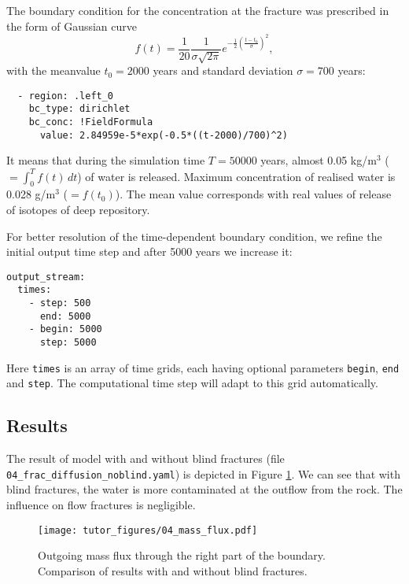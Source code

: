 The boundary condition for the concentration at the fracture was
prescribed in the form of Gaussian curve
\[ f(t) = \frac1{20} \frac{1}{\sigma\sqrt{2\pi}}e^{-\frac12\left(\frac{t-t_0}{\sigma}\right)^2}, \]
with the meanvalue \(t_0=2000\) years and standard deviation
\(\sigma=700\) years:

\begin{verbatim}
  - region: .left_0
    bc_type: dirichlet
    bc_conc: !FieldFormula
      value: 2.84959e-5*exp(-0.5*((t-2000)/700)^2)
\end{verbatim}

It means that during the simulation time \(T=50000\) years, almost 0.05
kg/m\(^3\) (\(=\int_0^Tf(t)\,dt\)) of water is released. Maximum
concentration of realised water is 0.028 g/m\(^3\) (\(=f(t_0)\)). The
mean value corresponds with real values of release of isotopes of deep
repository.

For better resolution of the time-dependent boundary condition, we
refine the initial output time step and after 5000 years we increase it:

\begin{verbatim}
output_stream:
  times:
    - step: 500
      end: 5000
    - begin: 5000
      step: 5000
\end{verbatim}

Here \texttt{times} is an array of time grids, each having optional
parameters \texttt{begin}, \texttt{end} and \texttt{step}. The
computational time step will adapt to this grid automatically.

\subsection{Results}

The result of model with and without blind fractures (file
\texttt{04\_frac\_diffusion\_noblind.yaml}) is depicted in Figure
\ref{fig:diff_res}. We can see that with blind fractures, the water is
more contaminated at the outflow from the rock. The influence on flow
fractures is negligible.

\begin{figure}[htbp]
\centering
\texttt{[image: tutor\_figures/04\_mass\_flux.pdf]}
\caption{Outgoing mass flux through the right part of the boundary.
Comparison of results with and without blind
fractures.\label{fig:diff_res}}
\end{figure}
